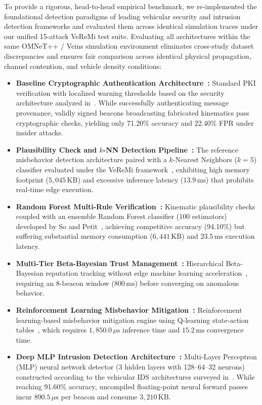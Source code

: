 \documentclass[conference]{IEEEtran}
\begin{document}
To provide a rigorous, head-to-head empirical benchmark, we re-implemented the foundational detection paradigms of leading vehicular security and intrusion detection frameworks and evaluated them across identical simulation traces under our unified 15-attack VeReMi test suite. Evaluating all architectures within the same OMNeT++ / Veins simulation environment eliminates cross-study dataset discrepancies and ensures fair comparison across identical physical propagation, channel contention, and vehicle density conditions:
\begin{itemize}
    \item \textbf{Baseline Cryptographic Authentication Architecture~\cite{raya}:} Standard PKI verification with localized warning thresholds based on the security architecture analyzed in~\cite{raya}. While successfully authenticating message provenance, validly signed beacons broadcasting fabricated kinematics pass cryptographic checks, yielding only 71.20\% accuracy and 22.40\% FPR under insider attacks.
    \item \textbf{Plausibility Check and $k$-NN Detection Pipeline~\cite{veremi}:} The reference misbehavior detection architecture paired with a $k$-Nearest Neighbors ($k=5$) classifier evaluated under the VeReMi framework~\cite{veremi}, exhibiting high memory footprint ($5,045\,\text{KB}$) and excessive inference latency ($13.9\,\text{ms}$) that prohibits real-time edge execution.
    \item \textbf{Random Forest Multi-Rule Verification~\cite{so2018verifying}:} Kinematic plausibility checks coupled with an ensemble Random Forest classifier (100 estimators) developed by So and Petit~\cite{so2018verifying}, achieving competitive accuracy (94.10\%) but suffering substantial memory consumption ($6,441\,\text{KB}$) and $23.5\,\text{ms}$ execution latency.
    \item \textbf{Multi-Tier Beta-Bayesian Trust Management~\cite{ahmad2019trust}:} Hierarchical Beta-Bayesian reputation tracking without edge machine learning acceleration~\cite{ahmad2019trust}, requiring an 8-beacon window ($800\,\text{ms}$) before converging on anomalous behavior.
    \item \textbf{Reinforcement Learning Misbehavior Mitigation~\cite{sedar2020reinforcement}:} Reinforcement learning-based misbehavior mitigation engine using Q-learning state-action tables~\cite{sedar2020reinforcement}, which requires $1,850.0\,\mu\text{s}$ inference time and $15.2\,\text{ms}$ convergence time.
    \item \textbf{Deep MLP Intrusion Detection Architecture~\cite{alrehan2019machine}:} Multi-Layer Perceptron (MLP) neural network detector (3 hidden layers with 128--64--32 neurons) constructed according to the vehicular IDS architectures surveyed in~\cite{alrehan2019machine}. While reaching 91.60\% accuracy, uncompiled floating-point neural forward passes incur $890.5\,\mu\text{s}$ per beacon and consume $3,210\,\text{KB}$.
\end{itemize}
\end{document}
